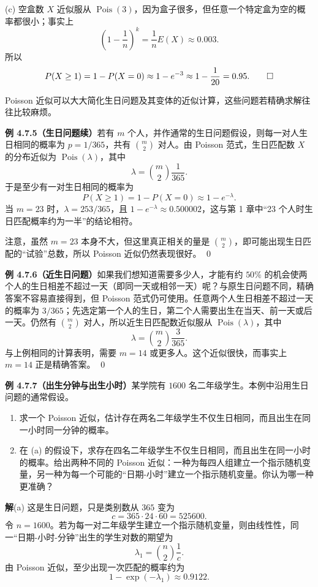 \documentclass[UTF8, 12pt, fontset=fandol, oneside]{ctexart}
\begin{document}
(c) 空盒数 $X$ 近似服从 $\operatorname{Pois}(3)$，因为盒子很多，但任意一个特定盒为空的概率都很小；事实上
\[
  \left(1-\frac{1}{n}\right)^k=\frac{1}{n}E(X)\approx 0.003.
\]
所以
\[
  P(X\ge 1)=1-P(X=0)\approx 1-e^{-3}\approx 1-\frac{1}{20}=0.95. \qed
\]

Poisson 近似可以大大简化生日问题及其变体的近似计算，这些问题若精确求解往往比较麻烦。

\noindent\textbf{例 4.7.5（生日问题续）}\quad 若有 $m$ 个人，并作通常的生日问题假设，则每一对人生日相同的概率为 $p=1/365$，共有 $\binom{m}{2}$ 对人。由 Poisson 范式，生日匹配数 $X$ 的分布近似为 $\operatorname{Pois}(\lambda)$，其中
\[
  \lambda=\binom{m}{2}\frac{1}{365}.
\]
于是至少有一对生日相同的概率为
\[
  P(X\ge 1)=1-P(X=0)\approx 1-e^{-\lambda}.
\]
当 $m=23$ 时，$\lambda=253/365$，且 $1-e^{-\lambda}\approx 0.500002$，这与第 1 章中“23 个人时生日匹配概率约为一半”的结论相符。

注意，虽然 $m=23$ 本身不大，但这里真正相关的量是 $\binom{m}{2}$，即可能出现生日匹配的“试验”总数，所以 Poisson 近似仍然表现很好。 \qed

\noindent\textbf{例 4.7.6（近生日问题）}\quad 如果我们想知道需要多少人，才能有约 $50\%$ 的机会使两个人的生日相差不超过一天（即同一天或相邻一天）呢？与原生日问题不同，精确答案不容易直接得到，但 Poisson 范式仍可使用。任意两个人生日相差不超过一天的概率为 $3/365$；先选定第一个人的生日，第二个人需要出生在当天、前一天或后一天。仍然有 $\binom{m}{2}$ 对人，所以近生日匹配数近似服从 $\operatorname{Pois}(\lambda)$，其中
\[
  \lambda=\binom{m}{2}\frac{3}{365}.
\]
与上例相同的计算表明，需要 $m=14$ 或更多人。这个近似很快，而事实上 $m=14$ 正是精确答案。 \qed

\noindent\textbf{例 4.7.7（出生分钟与出生小时）}\quad 某学院有 $1600$ 名二年级学生。本例中沿用生日问题的通常假设。
\begin{enumerate}
  \item[(a)] 求一个 Poisson 近似，估计存在两名二年级学生不仅生日相同，而且出生在同一小时同一分钟的概率。
  \item[(b)] 在 (a) 的假设下，求存在四名二年级学生不仅生日相同，而且出生在同一小时的概率。给出两种不同的 Poisson 近似：一种为每四人组建立一个指示随机变量，另一种为每一个可能的“日期-小时”建立一个指示随机变量。你认为哪一种更准确？
\end{enumerate}

\noindent\textbf{解}\quad (a) 这是生日问题，只是类别数从 $365$ 变为
\[
  c=365\cdot 24\cdot 60=525600.
\]
令 $n=1600$。若为每一对二年级学生建立一个指示随机变量，则由线性性，同一“日期-小时-分钟”出生的学生对数的期望为
\[
  \lambda_1=\binom{n}{2}\frac{1}{c}.
\]
由 Poisson 近似，至少出现一次匹配的概率约为
\[
  1-\exp(-\lambda_1)\approx 0.9122.
\]
\end{document}
